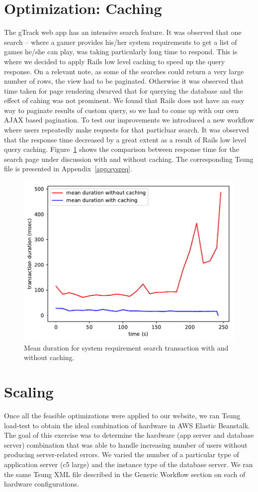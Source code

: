 \section{Optimization: Caching}
The gTrack web app has an intensive search feature. It was observed that one search -- where a gamer provides his/her system requirements to get a list of games he/she can play, was taking particularly long time to respond. This is where we decided to apply Rails low level caching to speed up the query response. On a relevant note, as some of the searches could return a very large number of rows, the view had to be paginated. Otherwise it was observed that time taken for page rendering dwarved that for querying the database and the effect of cahing was not prominent. We found that Rails does not have an easy way to paginate results of custom query, so we had to come up with our own AJAX based pagination. To test our improvements we introduced a new workflow where users repeatedly make requests for that particluar search. It was observed that the response time decreased by a great extent as a result of Rails low level query caching. Figure~\ref{fig:caching} shows the comparison between response time for the search page under discussion with and without caching. The corresponding Tsung file is presented in Appendix~\ref{app:sysreq}.
\begin{figure}
	\centering
	\includegraphics{images/caching}
	\caption{Mean duration for system requirement search transaction with and without caching.}\label{fig:caching}
\end{figure}

\section{Scaling}
Once all the feasible optimizations were applied to our website, we ran Tsung load-test to obtain the ideal combination of hardware in AWS Elastic Beanstalk. The goal of this exercise was to determine the hardware (app server and database server) combination that was able to handle increasing number of users without producing server-related errors. We varied the number of a particular type of application server (c5 large) and the instance type of the database server. We ran the same Tsung XML file described in the Generic Workflow section on each of hardware configurations. 

